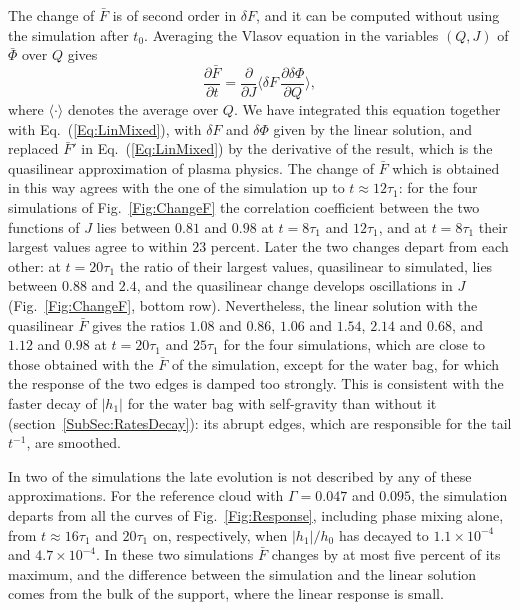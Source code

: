 The change of $\bar{F}$ is of second order in $\delta F$, and it can be computed without using the simulation after $t_0$. Averaging the Vlasov equation in the variables $(Q,J)$ of $\bar{\Phi}$ over $Q$ gives
\begin{equation}
\frac{\partial\bar{F}}{\partial t} = \frac{\partial}{\partial J}\langle\delta F\,\frac{\partial\delta\Phi}{\partial Q}\rangle,
\label{Eq:Quasilinear}
\end{equation}
where $\langle\cdot\rangle$ denotes the average over $Q$. We have integrated this equation together with Eq.~(\ref{Eq:LinMixed}), with $\delta F$ and $\delta\Phi$ given by the linear solution, and replaced $\bar{F}'$ in Eq.~(\ref{Eq:LinMixed}) by the derivative of the result, which is the quasilinear approximation of plasma physics. The change of $\bar{F}$ which is obtained in this way agrees with the one of the simulation up to $t\approx 12\tau_1$: for the four simulations of Fig.~\ref{Fig:ChangeF} the correlation coefficient between the two functions of $J$ lies between $0.81$ and $0.98$ at $t = 8\tau_1$ and $12\tau_1$, and at $t = 8\tau_1$ their largest values agree to within $23$ percent. Later the two changes depart from each other: at $t = 20\tau_1$ the ratio of their largest values, quasilinear to simulated, lies between $0.88$ and $2.4$, and the quasilinear change develops oscillations in $J$ (Fig.~\ref{Fig:ChangeF}, bottom row). Nevertheless, the linear solution with the quasilinear $\bar{F}$ gives the ratios $1.08$ and $0.86$, $1.06$ and $1.54$, $2.14$ and $0.68$, and $1.12$ and $0.98$ at $t = 20\tau_1$ and $25\tau_1$ for the four simulations, which are close to those obtained with the $\bar{F}$ of the simulation, except for the water bag, for which the response of the two edges is damped too strongly. This is consistent with the faster decay of $|h_1|$ for the water bag with self-gravity than without it (section~\ref{SubSec:RatesDecay}): its abrupt edges, which are responsible for the tail $t^{-1}$, are smoothed.

In two of the simulations the late evolution is not described by any of these approximations. For the reference cloud with $\Gamma = 0.047$ and $0.095$, the simulation departs from all the curves of Fig.~\ref{Fig:Response}, including phase mixing alone, from $t\approx 16\tau_1$ and $20\tau_1$ on, respectively, when $|h_1|/h_0$ has decayed to $1.1\times 10^{-4}$ and $4.7\times 10^{-4}$. In these two simulations $\bar{F}$ changes by at most five percent of its maximum, and the difference between the simulation and the linear solution comes from the bulk of the support, where the linear response is small.

